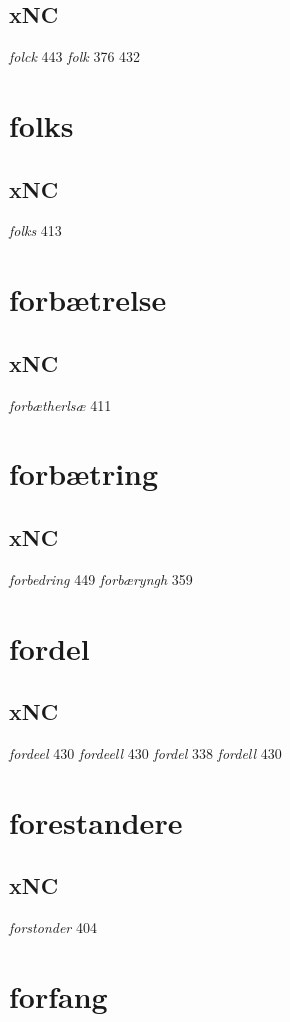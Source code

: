 \documentclass[a4paper,twocolumn]{article}
\begin{document}
\subsection{xNC}
\label{sec:org3a9e1ae}
\emph{folck} 443 \emph{folk} 376 432 
\section{folks}
\label{sec:org60c4ac1}
\subsection{xNC}
\label{sec:orgb79090e}
\emph{folks} 413 
\section{forbætrelse}
\label{sec:org920114a}
\subsection{xNC}
\label{sec:orgdae3d52}
\emph{forbætherlsæ} 411 
\section{forbætring}
\label{sec:org1877673}
\subsection{xNC}
\label{sec:orgc464f08}
\emph{forbedring} 449 \emph{forbæryngh} 359 
\section{fordel}
\label{sec:org17f0e99}
\subsection{xNC}
\label{sec:org7d5fe4f}
\emph{fordeel} 430 \emph{fordeell} 430 \emph{fordel} 338 \emph{fordell} 430 
\section{forestandere}
\label{sec:orgd7de9c8}
\subsection{xNC}
\label{sec:org5171afc}
\emph{forstonder} 404 
\section{forfang}
\label{sec:orgb77be79}
\end{document}
